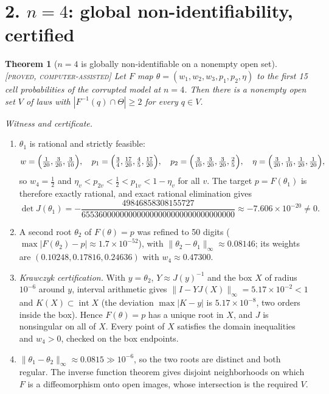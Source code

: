 \documentclass[11pt]{article}
\newtheorem{theorem}{Theorem}
\theoremstyle{remark}
\newcommand{\status}[1]{\hfill{\normalfont\small\textsc{[#1]}}}
\begin{document}
\section*{2. $n=4$: global non-identifiability, certified}

\begin{theorem}[$n=4$ is globally non-identifiable on a nonempty open set]\status{proved, computer-assisted}
Let $F$ map $\theta=(w_1,w_2,w_3,p_1,p_2,\eta)$ to the first 15 cell probabilities of the corrupted model at $n=4$. Then there is a nonempty open set $V$ of laws with $|F^{-1}(q)\cap\Theta|\ge2$ for every $q\in V$.
\end{theorem}

\noindent\emph{Witness and certificate.}
\begin{enumerate}
\item $\theta_1$ is rational and strictly feasible:
\[
w=\Bigl(\tfrac1{20},\tfrac3{20},\tfrac3{10}\Bigr),\quad
p_1=\Bigl(\tfrac34,\tfrac{17}{20},\tfrac45,\tfrac{17}{20}\Bigr),\quad
p_2=\Bigl(\tfrac3{10},\tfrac3{20},\tfrac3{20},\tfrac25\Bigr),\quad
\eta=\Bigl(\tfrac3{20},\tfrac1{10},\tfrac1{20},\tfrac1{20}\Bigr),
\]
so $w_4=\tfrac12$ and $\eta_v<p_{2v}<\tfrac12<p_{1v}<1-\eta_v$ for all $v$. The target $p=F(\theta_1)$ is therefore exactly rational, and exact rational elimination gives
\[
\det J(\theta_1)=-\frac{49846858308155727}{655360000000000000000000000000000000}\approx-7.606\times10^{-20}\neq0 .
\]
\item A second root $\theta_2$ of $F(\theta)=p$ was refined to 50 digits ($\max|F(\theta_2)-p|\approx1.7\times10^{-52}$), with $\|\theta_2-\theta_1\|_\infty\approx0.08146$; its weights are $(0.10248,0.17816,0.24636)$ with $w_4\approx0.47300$.
\item \emph{Krawczyk certification.} With $y=\theta_2$, $Y\approx J(y)^{-1}$ and the box $X$ of radius $10^{-6}$ around $y$, interval arithmetic gives $\|I-YJ(X)\|_\infty=5.17\times10^{-2}<1$ and $K(X)\subset\operatorname{int}X$ (the deviation $\max|K-y|$ is $5.17\times10^{-8}$, two orders inside the box). Hence $F(\theta)=p$ has a unique root in $X$, and $J$ is nonsingular on all of $X$. Every point of $X$ satisfies the domain inequalities and $w_4>0$, checked on the box endpoints.
\item $\|\theta_1-\theta_2\|_\infty\approx0.0815\gg10^{-6}$, so the two roots are distinct and both regular. The inverse function theorem gives disjoint neighborhoods on which $F$ is a diffeomorphism onto open images, whose intersection is the required $V$.
\end{enumerate}
\end{document}
